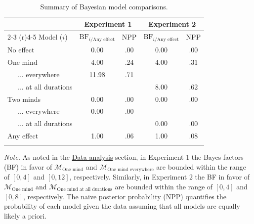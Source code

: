 \documentclass[
  man,floatsintext]{apa6}
\begin{document}
\begin{table}[tbp]

\begin{center}
\begin{threeparttable}

\caption{\label{tab:otm-bayesian-replication-analysis-table}Summary of Bayesian model comparisons.}

\begin{tabular}{lcccc}
\toprule
 & \multicolumn{2}{c}{Experiment 1} & \multicolumn{2}{c}{Experiment 2} \\
\cmidrule(r){2-3} \cmidrule(r){4-5}
Model ($i$) & \multicolumn{1}{c}{$\textrm{BF}_{i/{\textrm{Any effect}}}$} & \multicolumn{1}{c}{NPP} & \multicolumn{1}{c}{$\textrm{BF}_{i/{\textrm{Any effect}}}$} & \multicolumn{1}{c}{NPP}\\
\midrule
No effect & 0.00 & .00 & 0.00 & .00\\ \midrule
One mind & 4.00 & .24 & 4.00 & .31\\
\ \ \ ... everywhere & 11.98 & .71 &  & \\
\ \ \ ... at all durations &  &  & 8.00 & .62\\ \midrule
Two minds & 0.00 & .00 & 0.00 & .00\\
\ \ \ ... everywhere & 0.00 & .00 &  & \\
\ \ \ ... at all durations &  &  & 0.00 & .00\\ \midrule
Any effect & 1.00 & .06 & 1.00 & .08\\
\bottomrule
\addlinespace
\end{tabular}

\begin{tablenotes}[para]
\normalsize{\textit{Note.} As noted in the \protect\hyperlink{data-analysis1}{Data analysis} section, in Experiment 1 the Bayes factors (BF) in favor of \(\mathcal{M}_\textrm{One mind}\) and \(\mathcal{M}_\textrm{One mind everywhere}\) are bounded within the range of \([0, 4]\) and \([0, 12]\), respectively. Similarly, in Experiment 2 the BF in favor of \(\mathcal{M}_\textrm{One mind}\) and \(\mathcal{M}_\textrm{One mind at all durations}\) are bounded within the range of \([0, 4]\) and \([0, 8]\), respectively. The naive posterior probability (NPP) quantifies the probability of each model given the data assuming that all models are equally likely a priori.}
\end{tablenotes}

\end{threeparttable}
\end{center}

\end{table}
\end{document}
